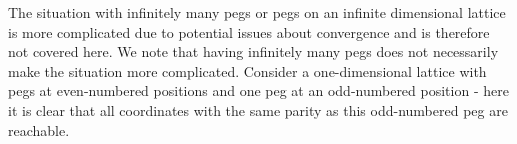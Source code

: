\begin{parts}
\begin{solution}
		The situation with infinitely many pegs or pegs on an infinite dimensional lattice is more complicated due to potential issues about convergence and is therefore not covered here. We note that having infinitely many pegs does not necessarily make the situation more complicated. Consider a one-dimensional lattice with pegs at even-numbered positions and one peg at an odd-numbered position - here it is clear that all coordinates with the same parity as this odd-numbered peg are reachable.
	
	\end{solution}

\end{parts}